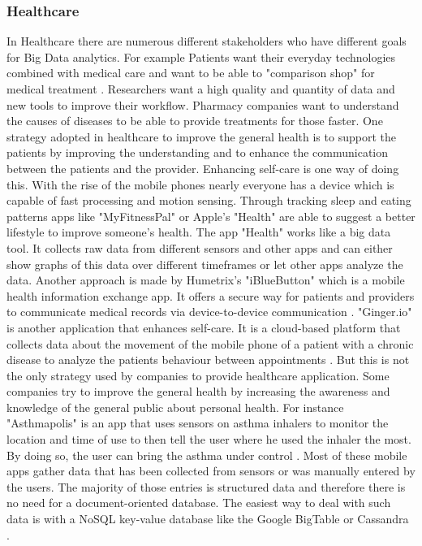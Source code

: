 \documentclass[runningheads]{llncs}
\begin{document}
\subsubsection{Healthcare}
In Healthcare there are numerous different stakeholders who have different goals for Big Data analytics. For example Patients want their everyday technologies combined with medical care and want to be able to "comparison shop" for medical treatment \cite{FELDMAN}. Researchers want a high quality and quantity of data and new tools to improve their workflow. Pharmacy companies want to understand the causes of diseases to be able to provide treatments for those faster.
One strategy adopted in healthcare to improve the general health is to support the patients by improving the understanding and to enhance the communication between the patients and the provider. Enhancing self-care is one way of doing this. With the rise of the mobile phones nearly everyone has a device which is capable of fast processing and motion sensing. Through tracking sleep and eating patterns apps like "MyFitnessPal" or Apple's "Health" are able to suggest a better lifestyle to improve someone's health. The app "Health" works like a big data tool. It collects raw data from different sensors and other apps and can either show graphs of this data over different timeframes or let other apps analyze the data. 
Another approach is made by Humetrix's "iBlueButton" which is a mobile health information exchange app. It offers a secure way for patients and providers to communicate medical records via device-to-device communication \cite{FELDMAN}. "Ginger.io" is another application that enhances self-care. It is a cloud-based platform that collects data about the movement of the mobile phone of a patient with a chronic disease to analyze the patients behaviour between appointments \cite{FELDMAN}. 
But this is not the only strategy used by companies to provide healthcare application. Some companies try to improve the general health by increasing the awareness and knowledge of the general public about personal health. For instance "Asthmapolis" is an app that uses sensors on asthma inhalers to monitor the location and time of use to then tell the user where he used the inhaler the most. By doing so, the user can bring the asthma under control \cite{FELDMAN}. 
Most of these mobile apps gather data that has been collected from sensors or was manually entered by the users. The majority of those entries is structured data and therefore there is no need for a document-oriented database. The easiest way to deal with such data is with a NoSQL key-value database like the Google BigTable or Cassandra \cite{GLOSSARY}.
\end{document}
